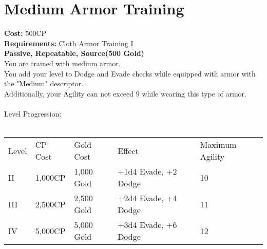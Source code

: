 \section{Medium Armor Training}\label{perk:mediumArmorTraining}
\textbf{Cost:} 500CP\\
\textbf{Requirements:} Cloth Armor Training I\\
\textbf{Passive, Repeatable, Source(500 Gold)}\\
You are trained with medium armor.\\
You add your level to Dodge and Evade checks while equipped with armor with the "Medium" descriptor.\\
Additionally, your Agility can not exceed 9 while wearing this type of armor.\\
\\
Level Progression:\\
\\
\begin{tabular}{l | l | l | l | l}
	Level & CP Cost & Gold Cost & Effect & Maximum Agility
	\\
	II
	& 1,000CP
	& 1,000 Gold
	& +1d4 Evade, +2 Dodge
	& 10
	\\
	III
	& 2,500CP
	& 2,500 Gold
	& +2d4 Evade, +4 Dodge
	& 11
	\\
	IV
	& 5,000CP
	& 5,000 Gold
	& +3d4 Evade, +6 Dodge
	& 12
	\\
\end{tabular}